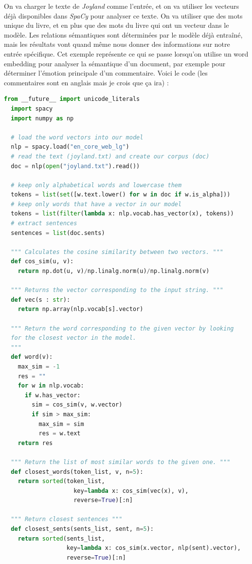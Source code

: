 \documentclass[11pt, a4paper]{report}
\begin{document}
On va charger le texte de \textit{Joyland} comme l'entrée, et on va utiliser les 
vecteurs déjà disponibles dans \textit{SpaCy} pour analyser ce texte. On va utiliser que 
des mots unique du livre, et en plus que des mots du livre qui ont un vecteur dans le 
modèle. Les relations sémantiques sont déterminées par le modèle déjà entraîné, mais 
les résultats vont quand même nous donner des informations sur notre entrée spécifique. 
Cet exemple représente ce qui se passe lorsqu'on utilise un word embedding pour analyser 
la sémantique d'un document, par exemple pour déterminer l'émotion principale d'un commentaire.
Voici le code (les commentaires sont en anglais mais je crois que ça ira) \cite{gensim-tuto}: 

\begin{lstlisting}[language=Python]
  from __future__ import unicode_literals
  import spacy 
  import numpy as np 

  # load the word vectors into our model 
  nlp = spacy.load("en_core_web_lg")
  # read the text (joyland.txt) and create our corpus (doc)
  doc = nlp(open("joyland.txt").read())

  # keep only alphabetical words and lowercase them 
  tokens = list(set([w.text.lower() for w in doc if w.is_alpha]))
  # keep only words that have a vector in our model 
  tokens = list(filter(lambda x: nlp.vocab.has_vector(x), tokens))
  # extract sentences
  sentences = list(doc.sents)

  """ Calculates the cosine similarity between two vectors. """
  def cos_sim(u, v):
    return np.dot(u, v)/np.linalg.norm(u)/np.linalg.norm(v)

  """ Returns the vector corresponding to the input string. """
  def vec(s : str):
    return np.array(nlp.vocab[s].vector)

  """ Return the word corresponding to the given vector by looking 
  for the closest vector in the model.
  """
  def word(v):
    max_sim = -1 
    res = ""
    for w in nlp.vocab:
      if w.has_vector:
        sim = cos_sim(v, w.vector)
        if sim > max_sim:
          max_sim = sim 
          res = w.text
    return res  

  """ Return the list of most similar words to the given one. """
  def closest_words(token_list, v, n=5):
    return sorted(token_list, 
                    key=lambda x: cos_sim(vec(x), v), 
                    reverse=True)[:n]

  """ Return closest sentences """
  def closest_sents(sents_list, sent, n=5):
    return sorted(sents_list, 
                  key=lambda x: cos_sim(x.vector, nlp(sent).vector), 
                  reverse=True)[:n]
\end{lstlisting}
\end{document}
